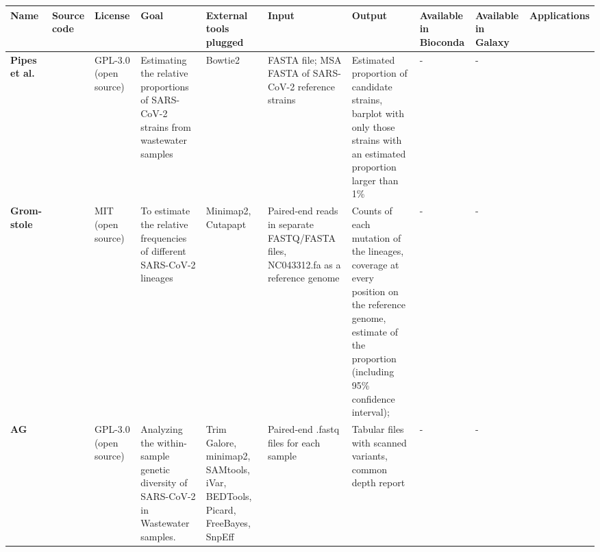 \begin{landscape}
\begin{table}[ht!]
                \tiny
                \begin{tabular}{l|l|l|l|l|l|l|l|l|l}
\multicolumn{1}{m{1cm}|}{\textbf{Name}}&\multicolumn{1}{m{1cm}|}{\textbf{Source code}}&\multicolumn{1}{m{1cm}|}{\textbf{License}}&\multicolumn{1}{m{3cm}|}{\textbf{Goal}}&\multicolumn{1}{m{3cm}|}{\textbf{External tools plugged}}&\multicolumn{1}{m{3cm}|}{\textbf{Input}}&\multicolumn{1}{m{3cm}|}{\textbf{Output}}&\multicolumn{1}{m{1cm}|}{\textbf{Available in Bioconda}}&\multicolumn{1}{m{1cm}|}{\textbf{Available in Galaxy}}&\multicolumn{1}{m{1cm}}{\textbf{Applications}}\\ \hline 
\multicolumn{1}{m{1cm}|}{\textbf{Pipes et al.}}&\multicolumn{1}{m{1cm}|}{\cite{pipes2022}}&\multicolumn{1}{m{1cm}|}{GPL-3.0 (open source)}&\multicolumn{1}{m{3cm}|}{Estimating the relative proportions of SARS-CoV-2 strains from wastewater samples}&\multicolumn{1}{m{3cm}|}{Bowtie2}&\multicolumn{1}{m{3cm}|}{FASTA file; MSA FASTA of SARS-CoV-2 reference strains}&\multicolumn{1}{m{3cm}|}{Estimated proportion of candidate strains, barplot with only those strains with an estimated proportion larger than 1\%}&\multicolumn{1}{m{1cm}|}{-}&\multicolumn{1}{m{1cm}|}{-}&\multicolumn{1}{m{1cm}}{\cite{pipes2022}}\\ \hline 
\multicolumn{1}{m{1cm}|}{\textbf{Grom- stole}}&\multicolumn{1}{m{1cm}|}{\cite{gromstole2022}}&\multicolumn{1}{m{1cm}|}{MIT (open source)}&\multicolumn{1}{m{3cm}|}{To estimate the relative frequencies of different SARS-CoV-2 lineages}&\multicolumn{1}{m{3cm}|}{Minimap2, Cutapapt}&\multicolumn{1}{m{3cm}|}{Paired-end reads in separate FASTQ/FASTA files, NC043312.fa as a reference genome}&\multicolumn{1}{m{3cm}|}{Counts of each mutation of the lineages, coverage at every position on the reference genome, estimate of the proportion (including 95\% confidence interval); }&\multicolumn{1}{m{1cm}|}{-}&\multicolumn{1}{m{1cm}|}{-}&\multicolumn{1}{m{1cm}}{\cite{gromstole2022}}\\ \hline 
\multicolumn{1}{m{1cm}|}{\textbf{AG}}&\multicolumn{1}{m{1cm}|}{\cite{nguessan2022}}&\multicolumn{1}{m{1cm}|}{GPL-3.0 (open source)}&\multicolumn{1}{m{3cm}|}{Analyzing the within-sample genetic diversity of SARS-CoV-2 in Wastewater samples.}&\multicolumn{1}{m{3cm}|}{Trim Galore, minimap2, SAMtools, iVar, BEDTools, Picard, FreeBayes, SnpEff}&\multicolumn{1}{m{3cm}|}{Paired-end .fastq files for each sample}&\multicolumn{1}{m{3cm}|}{Tabular files with scanned variants, common depth report}&\multicolumn{1}{m{1cm}|}{-}&\multicolumn{1}{m{1cm}|}{-}&\multicolumn{1}{m{1cm}}{\cite{nguessan2022}}\\ \hline 

\end{tabular}
\end{table}
\end{landscape}
